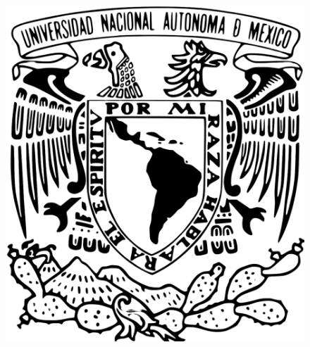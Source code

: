 \documentclass[8.5pt,letterpaper]{article}
\begin{document}
	
	\begin{figure}[h]
		\begin{center}
			\includegraphics[scale=0.07,bb=5400 1350 1350 100]{../../Figuras/image (6)}
		\end{center}
	\end{figure}
\end{document}
